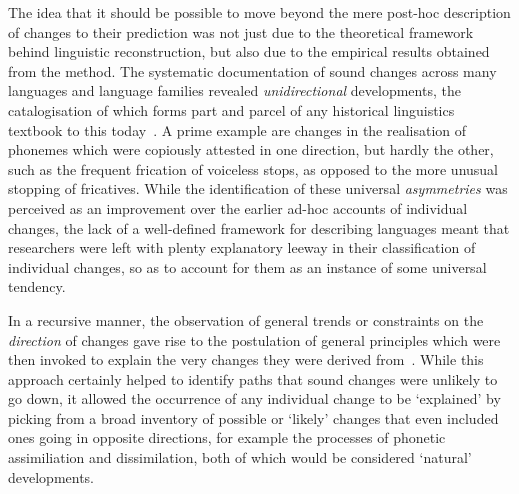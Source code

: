 The idea that it should be possible to move beyond the mere post-hoc description of changes to their prediction was not just due to the theoretical framework behind linguistic reconstruction, but also due to the empirical results obtained from the method. The systematic documentation of sound changes across many languages and language families revealed \emph{unidirectional} developments, the catalogisation of which forms part and parcel of any historical linguistics textbook to this today~\citep[see e.g.][]{Campbell2013}. A prime example are changes in the realisation of phonemes which were copiously attested in one direction, but hardly the other, such as the frequent frication of voiceless stops, as opposed to the more unusual stopping of fricatives. While the identification of these universal \emph{asymmetries} was perceived as an improvement over the earlier ad-hoc accounts of individual changes, the lack of a well-defined framework for describing languages meant that researchers were left with plenty explanatory leeway in their classification of individual changes, so as to account for them as an instance of some universal tendency.

In a recursive manner, the observation of general trends or constraints on the \emph{direction} of changes gave rise to the postulation of general principles which were then invoked to explain the very changes they were derived from~\citep{Lass1980,Haspelmath2006}. While this approach certainly helped to identify paths that sound changes were unlikely %
to go down, it allowed the occurrence of any individual change to be `explained' by picking from a broad inventory of possible or `likely' changes that even included ones going in opposite directions, for example the processes of phonetic assimiliation and dissimilation, both of which would be considered `natural' developments.

